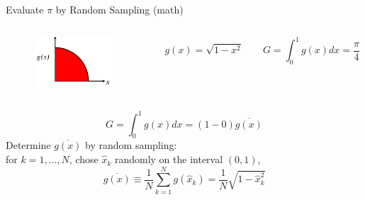\documentclass[xcolor=x11names,compress]{beamer}
\renewcommand{\(}{\begin{columns}}
\renewcommand{\)}{\end{columns}}
\newcommand{\<}[1]{\begin{column}{#1}}
\renewcommand{\>}{\end{column}}
\begin{document}
\begin{frame}{Evaluate $\pi$ by Random Sampling (math)}

\begin{columns}
  \begin{column}{0.3\textwidth}
  	\begin{figure}
  	\begin{center}
  		\includegraphics[height=0.75in,clip]{quarter-circle}
	\end{center}
  	\end{figure}
  \end{column}
  \begin{column}{0.7\textwidth}
    \begin{equation}
      g(x) = \sqrt{1 - x^2}	\qquad G = \int_0^1 g(x)dx = \frac{\pi}{4} \nonumber
    \end{equation}
  \end{column}
\end{columns}
\pause
\begin{equation}
  G = \int_0^1 g(x)dx = (1-0)\overline{g(x)} \nonumber
\end{equation}
Determine $\overline{g(x)}$ by random sampling:\\
\vspace*{0.5em}
\hspace*{2 em}for $k = 1, \dots, N$, chose $\hat{x}_k$ randomly on the interval $(0,1)$,
\[ \overline{g(x)} \equiv \frac{1}{N}\sum_{k=1}^N g(\hat{x}_k) = \frac{1}{N}\sqrt{1 - \hat{x}_k^2}\]

\end{frame}
\end{document}
